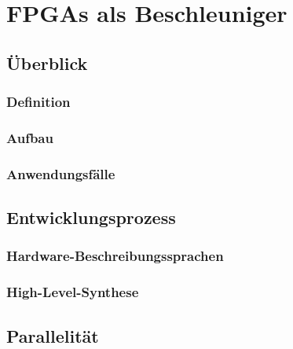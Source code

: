 \chapter{FPGAs als Beschleuniger}

\section{Überblick}

\subsection{Definition}

\subsection{Aufbau}

\subsection{Anwendungsfälle}

\section{Entwicklungsprozess}

\subsection{Hardware-Beschreibungssprachen}

\subsection{High-Level-Synthese}

\section{Parallelität}
